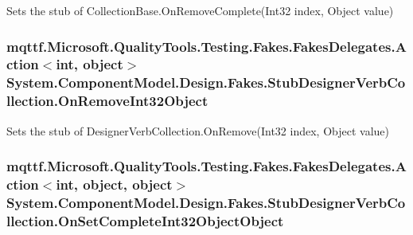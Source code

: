 Sets the stub of Collection\-Base.\-On\-Remove\-Complete(\-Int32 index, Object value)

\hypertarget{class_system_1_1_component_model_1_1_design_1_1_fakes_1_1_stub_designer_verb_collection_a6b074db032fffd2fa62d5aab04decd3d}{
\subsubsection[{On\-Remove\-Int32\-Object}]{\setlength{\rightskip}{0pt plus 5cm}mqttf.\-Microsoft.\-Quality\-Tools.\-Testing.\-Fakes.\-Fakes\-Delegates.\-Action$<$int, object$>$ System.\-Component\-Model.\-Design.\-Fakes.\-Stub\-Designer\-Verb\-Collection.\-On\-Remove\-Int32\-Object}}\label{class_system_1_1_component_model_1_1_design_1_1_fakes_1_1_stub_designer_verb_collection_a6b074db032fffd2fa62d5aab04decd3d}


Sets the stub of Designer\-Verb\-Collection.\-On\-Remove(\-Int32 index, Object value)

\hypertarget{class_system_1_1_component_model_1_1_design_1_1_fakes_1_1_stub_designer_verb_collection_aecd9eb7bb924e2e810fe9ff3a7f16761}{
\subsubsection[{On\-Set\-Complete\-Int32\-Object\-Object}]{\setlength{\rightskip}{0pt plus 5cm}mqttf.\-Microsoft.\-Quality\-Tools.\-Testing.\-Fakes.\-Fakes\-Delegates.\-Action$<$int, object, object$>$ System.\-Component\-Model.\-Design.\-Fakes.\-Stub\-Designer\-Verb\-Collection.\-On\-Set\-Complete\-Int32\-Object\-Object}}\label{class_system_1_1_component_model_1_1_design_1_1_fakes_1_1_stub_designer_verb_collection_aecd9eb7bb924e2e810fe9ff3a7f16761}


